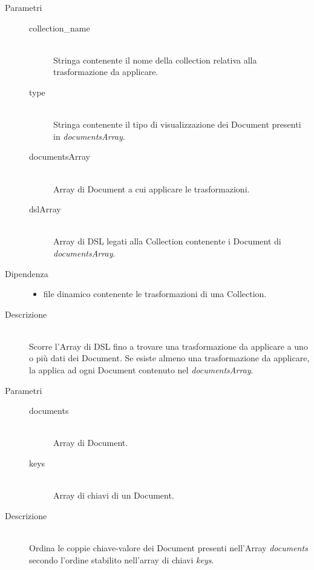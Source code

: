 \begin{description}
\begin{mldescription}
	 \hfill 
		\begin{description}
			\item[Parametri] \hfill
				\begin{description}
				\item[collection\_name] \hfill \\
					Stringa contenente il nome della collection relativa alla trasformazione da applicare.
					\item[type] \hfill \\
						Stringa contenente il tipo di visualizzazione dei Document presenti in 										\textit{documentsArray}.
					\item[documentsArray] \hfill \\
						Array di Document a cui applicare le trasformazioni.
					\item[dslArray] \hfill \\
						Array di DSL legati alla Collection contenente i Document di \textit{documentsArray}.
				\end{description}
			\item[Dipendenza] \hfill 
				\begin{itemize}
					\item file dinamico contenente le trasformazioni di una Collection.
				\end{itemize}
			\item[Descrizione] \hfill \\	
			Scorre l'Array di DSL fino a trovare una trasformazione da applicare a uno o più dati dei Document. Se esiste almeno una trasformazione da applicare, la applica ad ogni Document contenuto nel \textit{documentsArray}.							
		\end{description}
		
	 \hfill 
		\begin{description}
			\item[Parametri] \hfill
				\begin{description}
					\item[documents] \hfill \\
					Array di Document.
					\item[keys] \hfill \\
					Array di chiavi di un Document.
				\end{description}
			\item[Descrizione] \hfill \\
			Ordina le coppie chiave-valore dei Document presenti nell'Array \textit{documents} secondo 
			l'ordine stabilito nell'array di chiavi \textit{keys}.
		\end{description}			
	

\end{mldescription}
\end{description}
